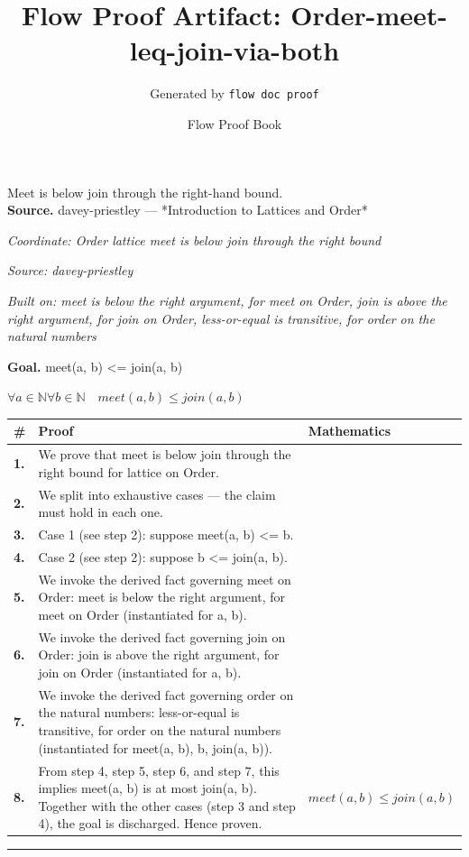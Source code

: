 \documentclass[11pt]{article}
\title{Flow Proof Artifact: Order-meet-leq-join-via-both}
\author{Generated by \texttt{flow doc proof}}
\date{Flow Proof Book}
\theoremstyle{definition}
\begin{document}
\maketitle
Meet is below join through the right-hand bound.\\[0.5em]
\textbf{Source.} davey-priestley — *Introduction to Lattices and Order*\\[0.5em]
\bigskip
{}\par
\smallskip\noindent\textit{Coordinate: Order \cdot lattice \cdot meet is below join through the right bound}\par
\smallskip\noindent\textit{Source: davey-priestley}\par
\smallskip\noindent\textit{Built on: meet is below the right argument, for meet on Order, join is above the right argument, for join on Order, less-or-equal is transitive, for order on the natural numbers}\par
\medskip
\noindent\textbf{Goal.} meet(a, b) <= join(a, b)\par
\noindent$\displaystyle \forall a \in \mathbb{N} \forall b \in \mathbb{N}\quad meet(a, b) \le join(a, b)$\par
\medskip
\noindent
\begin{tabular}{@{} >{\raggedright\arraybackslash}p{} >{\raggedright\arraybackslash}p{} >{\raggedleft\arraybackslash}p{} @{}}
\textbf{\#} & \textbf{Proof} & \textbf{Mathematics} \\
\midrule
\textbf{1.} & We prove that meet is below join through the right bound for lattice on Order. & \\[0.45em]
\textbf{2.} & We split into exhaustive cases — the claim must hold in each one. & \\[0.45em]
\textbf{3.} & Case 1 (see step 2): suppose meet(a, b) <= b. & \\[0.45em]
\textbf{4.} & Case 2 (see step 2): suppose b <= join(a, b). & \\[0.45em]
\textbf{5.} & We invoke the derived fact governing meet on Order: meet is below the right argument, for meet on Order (instantiated for a, b). & \\[0.45em]
\textbf{6.} & We invoke the derived fact governing join on Order: join is above the right argument, for join on Order (instantiated for a, b). & \\[0.45em]
\textbf{7.} & We invoke the derived fact governing order on the natural numbers: less-or-equal is transitive, for order on the natural numbers (instantiated for meet(a, b), b, join(a, b)). & \\[0.45em]
\textbf{8.} & From step 4, step 5, step 6, and step 7, this implies meet(a, b) is at most join(a, b). Together with the other cases (step 3 and step 4), the goal is discharged. Hence proven. & $\displaystyle meet(a, b) \le join(a, b)$ \\[0.45em]
\bottomrule
\end{tabular}
\label{thm:Order-lattice-meet_is_below_join_through_the_right_bound}
\par\medskip\hrule
\end{document}
